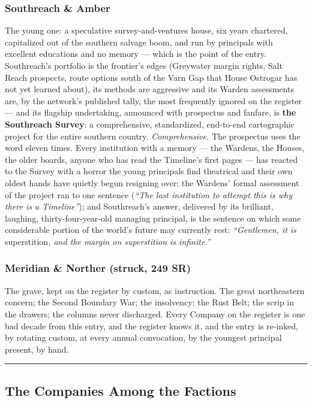 \subsubsection{Southreach \& Amber}

The young one: a speculative survey-and-ventures house, six years chartered, capitalized out of the southern salvage boom, and run by principals with excellent educations and no memory --- which is the point of the entry. Southreach's portfolio is the frontier's edges (Greywater margin rights, Salt Reach prospects, route options south of the Varn Gap that House Ostrogar has not yet learned about), its methods are aggressive and its Warden assessments are, by the network's published tally, the most frequently ignored on the register --- and its flagship undertaking, announced with prospectus and fanfare, is \textbf{the Southreach Survey}: a comprehensive, standardized, end-to-end cartographic project for the entire southern country. \textit{Comprehensive.} The prospectus uses the word eleven times. Every institution with a memory --- the Wardens, the Houses, the older boards, anyone who has read the Timeline's first pages --- has reacted to the Survey with a horror the young principals find theatrical and their own oldest hands have quietly begun resigning over; the Wardens' formal assessment of the project ran to one sentence (\textit{``The last institution to attempt this is why there is a Timeline''}); and Southreach's answer, delivered by its brilliant, laughing, thirty-four-year-old managing principal, is the sentence on which some considerable portion of the world's future may currently rest: \textit{``Gentlemen, it is} superstition\textit{, and the margin on superstition is infinite.''}

\subsubsection{Meridian \& Norther (struck, 249 SR)}

The grave, kept on the register by custom, as instruction. The great northeastern concern; the Second Boundary War; the insolvency; the Rust Belt; the scrip in the drawers; the columns never discharged. Every Company on the register is one bad decade from this entry, and the register knows it, and the entry is re-inked, by rotating custom, at every annual convocation, by the youngest principal present, by hand.

\medskip\hrule\medskip

\subsection{The Companies Among the Factions}

